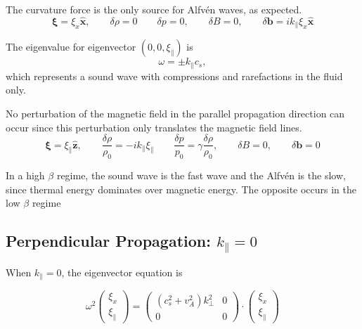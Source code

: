 The curvature force is the only source for Alfv\'en waves, as expected.
\begin{equation*}
    \boldsymbol{\xi}= \xi_x \hat{\boldsymbol{x}}, \qquad \delta\rho=0 \qquad \delta p=0, \qquad \delta B=0, \qquad \delta\boldsymbol{b}= ik_{\parallel} \xi_x \hat{\boldsymbol{x}}
\end{equation*}

The eigenvalue for eigenvector \((0,0, \xi_{\parallel} )\) is 
\begin{equation*}
    \omega=\pm k_{\parallel}c_s,
\end{equation*}
which represents a sound wave with compressions and rarefactions in the fluid only.

No perturbation of the magnetic field in the parallel propagation direction can occur since this perturbation only translates the magnetic field lines.
\begin{equation*}
    \boldsymbol{\xi}= \xi_{\parallel} \hat{\boldsymbol{z}}, \qquad \frac{\delta\rho}{\rho_0}=-ik_{\parallel}\xi_{\parallel} \qquad \frac{\delta p}{p_0}=\gamma \frac{\delta\rho}{\rho_0}, \qquad \delta B=0, \qquad \delta\boldsymbol{b}= 0
\end{equation*}

In a high \(\beta\) regime, the sound wave is the fast wave and the Alfv\'en is the slow, since thermal energy dominates over magnetic energy. The opposite occurs in the low \(\beta\) regime

\subsection{Perpendicular Propagation: \(k_{\parallel}=0\)}
When \(k_{\parallel}=0\), the eigenvector equation is 

\begin{equation*}
    \omega^{2}
    \begin{pmatrix}
        \xi_{x} \\
        \xi_{\parallel}
    \end{pmatrix}
    =
    \begin{pmatrix}
       ( c_{s}^{2} + v_{A}^{2}) k_{\perp}^{2} & 0 \\
       0 & 0
    \end{pmatrix}
    \cdot
    \begin{pmatrix}
        \xi_{x} \\
        \xi_{\parallel}
    \end{pmatrix}
    \label{eq:placeholder_label}
\end{equation*}

